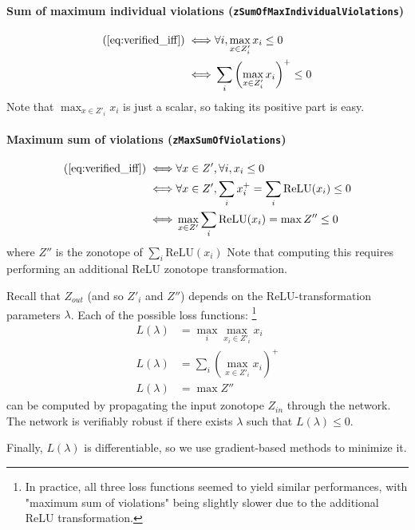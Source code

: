 \documentclass{article}
\newcommand{\relu}{\text{ReLU}}
\begin{document}
\paragraph{Sum of maximum individual violations (\texttt{zSumOfMaxIndividualViolations})}
\begin{align*}
    ( \ref{eq:verified_iff} )
    \iff & \forall i, \max_{x \in Z'_i} x_i \leq 0 \\
    \iff & \sum_i \left( \max_{x \in Z'_i} x_i \right)^+ \leq 0 \\
\end{align*}
Note that $\max_{x \in Z'_i} x_i$ is just a scalar, so taking its positive part is easy.

\paragraph{Maximum sum of violations (\texttt{zMaxSumOfViolations})}
\begin{align*}
    ( \ref{eq:verified_iff} )
    \iff & \forall x \in Z', \forall i, x_i \leq 0 \\
    \iff & \forall x \in Z', \sum_i x_i^+ = \sum_i \relu(x_i) \leq 0 \\
    \iff & \max_{x \in Z'} \sum_i \relu(x_i) = \max Z'' \leq 0  
\end{align*}
where $Z''$ is the zonotope of $\sum_i \relu(x_i)$
Note that computing this requires performing an additional ReLU zonotope transformation.

Recall that $Z_{out}$ (and so $Z'_i$ and $Z''$) depends on the ReLU-transformation parameters $\lambda$. Each of the possible loss functions:
\footnote{In practice, all three loss functions seemed to yield similar performances, with "maximum sum of violations" being slightly slower due to the additional ReLU transformation.}
\begin{align}
    L(\lambda) &= \max_i \max_{x_i \in Z'_i} x_i                 \tag{maximum violation} \\
    L(\lambda) &= \sum_i \left( \max_{x \in Z'_i} x_i \right)^+  \tag{sum of maximum individual violations} \\ 
    L(\lambda) &= \max Z''                                       \tag{maximum sum of violations}
\end{align}
can be computed by propagating the input zonotope $Z_{in}$ through the network.
The network is verifiably robust if there exists $\lambda$ such that $L(\lambda) \leq 0$.

Finally, $L(\lambda)$ is differentiable, so we use gradient-based methods to minimize it.
\end{document}
